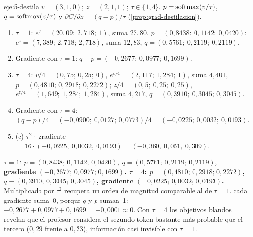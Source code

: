 \begin{solucion}{eje:5-destila}
\datos $v=(3,1,0)$; $z=(2,1,1)$; $\tau\in\{1,4\}$.
\planteamiento $p=\operatorname{softmax}(v/\tau)$, $q=\operatorname{softmax}(z/\tau)$ y $\partial C/\partial z=(q-p)/\tau$ (\cref{prop:grad-destilacion}).
\pasos
\begin{enumerate}[label=\arabic*.]
  \item $\tau=1$: $e^{v}=(20{,}09;\allowbreak\ 2{,}718;\allowbreak\ 1)$, suma $23{,}80$, $p=(0{,}8438;\allowbreak\ 0{,}1142;\allowbreak\ 0{,}0420)$; $e^{z}=(7{,}389;\allowbreak\ 2{,}718;\allowbreak\ 2{,}718)$, suma $12{,}83$, $q=(0{,}5761;\allowbreak\ 0{,}2119;\allowbreak\ 0{,}2119)$.
  \item Gradiente con $\tau=1$: $q-p=(-0{,}2677;\allowbreak\ 0{,}0977;\allowbreak\ 0{,}1699)$.
  \item $\tau=4$: $v/4=(0{,}75;\allowbreak\ 0{,}25;\allowbreak\ 0)$, $e^{v/4}=(2{,}117;\allowbreak\ 1{,}284;\allowbreak\ 1)$, suma $4{,}401$, $p=(0{,}4810;\allowbreak\ 0{,}2918;\allowbreak\ 0{,}2272)$; $z/4=(0{,}5;\allowbreak\ 0{,}25;\allowbreak\ 0{,}25)$, $e^{z/4}=(1{,}649;\allowbreak\ 1{,}284;\allowbreak\ 1{,}284)$, suma $4{,}217$, $q=(0{,}3910;\allowbreak\ 0{,}3045;\allowbreak\ 0{,}3045)$.
  \item Gradiente con $\tau=4$: $(q-p)/4=(-0{,}0900;\allowbreak\ 0{,}0127;\allowbreak\ 0{,}0773)/4=(-0{,}0225;\allowbreak\ 0{,}0032;\allowbreak\ 0{,}0193)$.
  \item (c) $\tau^{2}\cdot$ gradiente $=16\cdot(-0{,}0225;\allowbreak\ 0{,}0032;\allowbreak\ 0{,}0193)=(-0{,}360;\allowbreak\ 0{,}051;\allowbreak\ 0{,}309)$.
\end{enumerate}
\resultado \textbf{$\tau=1$: $p=(0{,}8438;\allowbreak\,0{,}1142;\allowbreak\,0{,}0420)$, $q=(0{,}5761;\allowbreak\,0{,}2119;\allowbreak\,0{,}2119)$, gradiente $(-0{,}2677;\allowbreak\,0{,}0977;\allowbreak\,0{,}1699)$. $\tau=4$: $p=(0{,}4810;\allowbreak\,0{,}2918;\allowbreak\,0{,}2272)$, $q=(0{,}3910;\allowbreak\,0{,}3045;\allowbreak\,0{,}3045)$, gradiente $(-0{,}0225;\allowbreak\,0{,}0032;\allowbreak\,0{,}0193)$.} Multiplicado por $\tau^{2}$ recupera un orden de magnitud comparable al de $\tau=1$.
\comprobacion cada gradiente suma~0, porque $q$ y $p$ suman~1: $-0{,}2677+0{,}0977+0{,}1699=-0{,}0001\approx 0$. Con $\tau=4$ los objetivos blandos revelan que el profesor considera el segundo token bastante más probable que el tercero ($0{,}29$ frente a $0{,}23$), información casi invisible con $\tau=1$.
\end{solucion}

